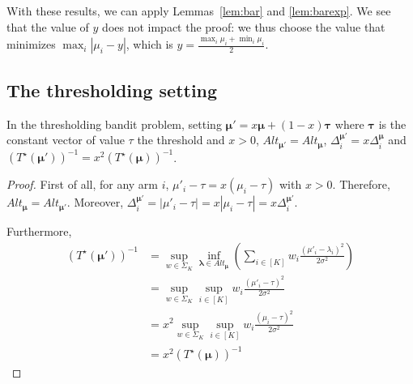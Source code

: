 With these results, we can apply Lemmas~\ref{lem:bar} and \ref{lem:barexp}. We see that the value of $y$ does not impact the proof: we thus choose the value that minimizes $\max_i |\mu_i-y|$, which is $y = \frac{\max_i \mu_i+\min_i\mu_i}{2}$.

	

	

\subsection{The thresholding setting}

\begin{lemma}\label{lem:tbpgoodbar}
	In the thresholding bandit problem, setting $\bm\mu' = x\bm\mu + (1-x)\bm \tau$ where $\bm \tau$ is the constant vector of value $\tau$ the threshold and $x>0$, $Alt_{\bm\mu'}=Alt_{\bm\mu}$, $\Delta_i^{\bm\mu'}=x\Delta_i^{\bm\mu}$ and $(T^\star(\bm\mu'))^{-1}=x^2(T^\star(\bm\mu))^{-1}$.
\end{lemma}

\begin{proof}
	First of all, for any arm $i$, $\mu'_i -\tau = x(\mu_i-\tau)$ with $x>0$. Therefore, $Alt_{\bm\mu}=Alt_{\bm\mu'}$. Moreover, $\Delta_i^{\bm\mu'}=|\mu'_i-\tau|=x|\mu_i-\tau|=x\Delta_i^{\bm\mu'}$.
	
	Furthermore, \begin{align*}
		(T^\star(\bm\mu'))^{-1}&=\sup_{w\in \Sigma_K} \inf_{\bm\lambda\in Alt_{\bm\mu}} \left( \sum_{i\in[K]} w_i\frac{(\mu'_i-\lambda_i)^2}{2\sigma^2}\right)\\
		&=\sup_{w\in \Sigma_K} \sup_{i\in [K]} w_i \frac{(\mu'_i-\tau)^2}{2\sigma^2}\\
		&=x^2 \sup_{w\in \Sigma_K} \sup_{i\in [K]} w_i \frac{(\mu_i-\tau)^2}{2\sigma^2}\\
		&=x^2(T^\star(\bm\mu))^{-1}
	\end{align*}
\end{proof}

